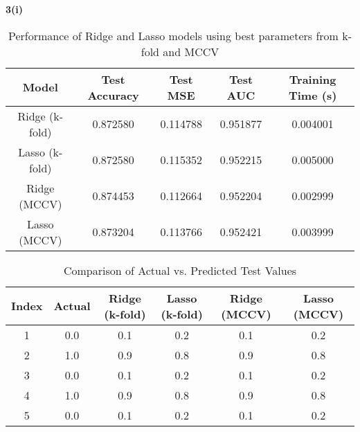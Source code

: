 \documentclass[10pt,letterpaper]{article}
\begin{document}
            \textbf{3(i)}  
                \begin{table}[H]
                    \centering
                    \begin{tabular}{|c|c|c|c|c|}
                    \hline
                    \textbf{Model} & \textbf{Test Accuracy} & \textbf{Test MSE} & \textbf{Test AUC} & \textbf{Training Time (s)} \\
                    \hline
                    Ridge (k-fold) & 0.872580 & 0.114788 & 0.951877 & 0.004001 \\
                    Lasso (k-fold) & 0.872580 & 0.115352 & 0.952215 & 0.005000 \\
                    Ridge (MCCV) & 0.874453 & 0.112664 & 0.952204 & 0.002999 \\
                    Lasso (MCCV) & 0.873204 & 0.113766 & 0.952421 & 0.003999 \\
                    \hline
                    \end{tabular}
                    \caption{Performance of Ridge and Lasso models using best parameters from k-fold and MCCV}
                    \label{tab:results}
                \end{table}
                \begin{table}[H]
                    \centering
                    \begin{tabular}{|c|c|c|c|c|c|}
                    \hline
                    \textbf{Index} & \textbf{Actual} & \textbf{Ridge (k-fold)} & \textbf{Lasso (k-fold)} & \textbf{Ridge (MCCV)} & \textbf{Lasso (MCCV)} \\
                    \hline
                    1 & 0.0 & 0.1 & 0.2 & 0.1 & 0.2 \\
                    2 & 1.0 & 0.9 & 0.8 & 0.9 & 0.8 \\
                    3 & 0.0 & 0.1 & 0.2 & 0.1 & 0.2 \\
                    4 & 1.0 & 0.9 & 0.8 & 0.9 & 0.8 \\
                    5 & 0.0 & 0.1 & 0.2 & 0.1 & 0.2 \\
                    \hline
                    \end{tabular}
                    \caption{Comparison of Actual vs. Predicted Test Values}
                    \label{tab:comparison}
                \end{table}
                
\end{document}
